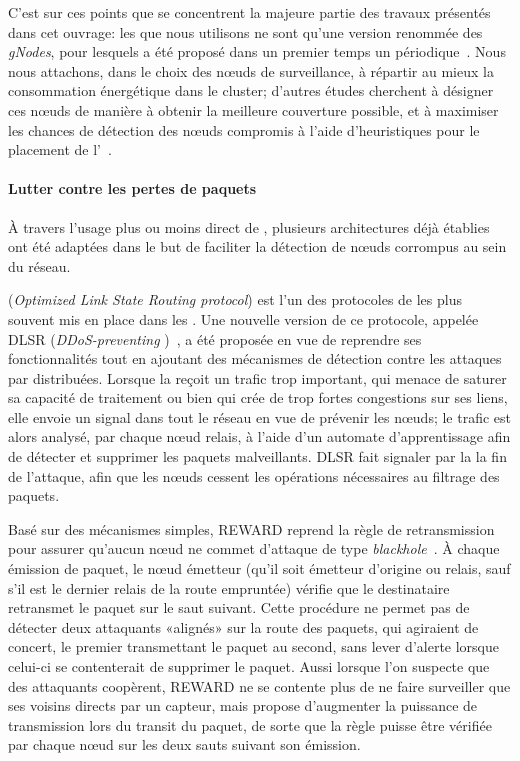 C'est sur ces points que se concentrent la majeure partie des travaux présentés dans cet ouvrage: les \cns que nous utilisons ne sont qu'une version renommée des \textit{gNodes}, pour lesquels a été proposé dans un premier temps un  périodique~\cite{GMT12}.
Nous nous attachons, dans le choix des nœuds de surveillance, à répartir au mieux la consommation énergétique dans le cluster; d'autres études cherchent à désigner ces nœuds de manière à obtenir la meilleure couverture possible, et à maximiser les chances de détection des nœuds compromis à l'aide d'heuristiques pour le placement de l'\IDS~\cite{INK09}.

        \paragraph{Lutter contre les pertes de paquets}
À travers l'usage plus ou moins direct de \idss, plusieurs architectures déjà établies ont été adaptées dans le but de faciliter la détection de nœuds corrompus au sein du réseau.

\olsr (\textit{Optimized Link State Routing protocol}) est l'un des protocoles de  les plus souvent mis en place dans les \rcs.
Une nouvelle version de ce protocole, appelée DLSR (\textit{DDoS-preventing \olsr})~\cite{MKASF10}, a été proposée en vue de reprendre ses fonctionnalités tout en ajoutant des mécanismes de détection contre les attaques par \dds distribuées.
Lorsque la \sdb reçoit un trafic trop important, qui menace de saturer sa capacité de traitement ou bien qui crée de trop fortes congestions sur ses liens, elle envoie un signal dans tout le réseau en vue de prévenir les nœuds; le trafic est alors analysé, par chaque nœud relais, à l'aide d'un automate d'apprentissage afin de détecter et supprimer les paquets malveillants.
DLSR fait signaler par la \sdb la fin de l'attaque, afin que les nœuds cessent les opérations nécessaires au filtrage des paquets.

Basé sur des mécanismes simples, REWARD reprend la règle de retransmission pour assurer qu'aucun nœud ne commet d'attaque de type \textit{blackhole}~\cite{Kar05}.
À chaque émission de paquet, le nœud émetteur (qu'il soit émetteur d'origine ou relais, sauf s'il est le dernier relais de la route empruntée) vérifie que le destinataire retransmet le paquet sur le saut suivant.
Cette procédure ne permet pas de détecter deux attaquants «alignés» sur la route des paquets, qui agiraient de concert, le premier transmettant le paquet au second, sans lever d'alerte lorsque celui-ci se contenterait de supprimer le paquet.
Aussi lorsque l'on suspecte que des attaquants coopèrent, REWARD ne se contente plus de ne faire surveiller que ses voisins directs par un capteur, mais propose d'augmenter la puissance de transmission lors du transit du paquet, de sorte que la règle puisse être vérifiée par chaque nœud sur les deux sauts suivant son émission.

